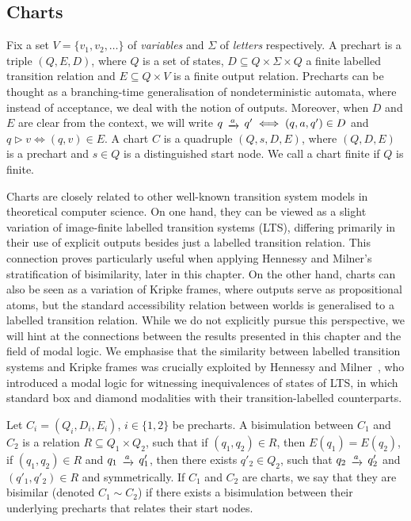\subsection{Charts}
Fix a set $V=\{v_1, v_2, \dots\}$ of \emph{variables} and $\Sigma$ of \emph{letters} respectively. A prechart is a triple $(Q,E,D)$, where $Q$ is a set of states, $D \subseteq Q \times \Sigma \times Q$ a finite labelled transition relation and $E \subseteq Q \times V$ is a finite output relation. Precharts can be thought as a branching-time generalisation of nondeterministic automata, where instead of acceptance, we deal with the notion of outputs. Moreover, when $D$ and $E$ are clear from the context, we will write $q \tr{a} q' \iff (q,a,q') \in D$ and $q \rhd v \iff (q,v) \in E$. A chart $C$ is a quadruple $(Q, s, D, E)$, where $(Q,D,E)$ is a prechart and $s \in Q$ is a distinguished start node. We call a chart finite if $Q$ is finite.
\begin{remark}\label{c3:rem:kripke}
	Charts are closely related to other well-known transition system models in theoretical computer science. On one hand, they can be viewed as a slight variation of image-finite labelled transition systems (LTS), differing primarily in their use of explicit outputs besides just a labelled transition relation. This connection proves particularly useful when applying Hennessy and Milner’s stratification of bisimilarity, later in this chapter. On the other hand, charts can also be seen as a variation of Kripke frames, where outputs serve as propositional atoms, but the standard accessibility relation between worlds is generalised to a labelled transition relation. While we do not explicitly pursue this perspective, we will hint at the connections between the results presented in this chapter and the field of modal logic.   We emphasise that the similarity between labelled transition systems and Kripke frames was crucially exploited by Hennessy and Milner~\cite{hennessy:1985:algebraic}, who introduced a modal logic for witnessing inequivalences of states of LTS, in which standard box and diamond modalities with their transition-labelled counterparts.
\end{remark}
\begin{definition}
	Let $C_i = (Q_i,D_i,E_i)$, $i \in \{1,2\}$ be precharts. A bisimulation between $C_1$ and $C_2$ is a relation ${R} \subseteq Q_1 \times Q_2$, such that  if $(q_1,q_2)\in R$, then $E(q_1)=E(q_2)$,  if $(q_1,q_2) \in R$ and $q_1 \tr{a} q'_1$, then there exists $q'_2 \in Q_2$, such that $q_2 \tr{a} q'_2$ and $(q'_1, q'_2) \in R$ and symmetrically. If $C_1$ and $C_2$ are charts, we say that they are bisimilar (denoted $C_1 \sim C_2$) if there exists a bisimulation between their underlying precharts that relates their start nodes.
\end{definition}
